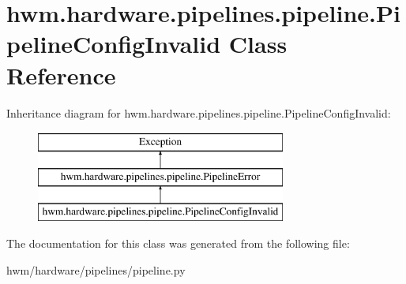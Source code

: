 \hypertarget{classhwm_1_1hardware_1_1pipelines_1_1pipeline_1_1_pipeline_config_invalid}{\section{hwm.\-hardware.\-pipelines.\-pipeline.\-Pipeline\-Config\-Invalid Class Reference}
\label{classhwm_1_1hardware_1_1pipelines_1_1pipeline_1_1_pipeline_config_invalid}
}
Inheritance diagram for hwm.\-hardware.\-pipelines.\-pipeline.\-Pipeline\-Config\-Invalid\-:\begin{figure}[H]
\begin{center}
\leavevmode
\includegraphics[height=3.000000cm]{classhwm_1_1hardware_1_1pipelines_1_1pipeline_1_1_pipeline_config_invalid}
\end{center}
\end{figure}


The documentation for this class was generated from the following file\-:\begin{DoxyCompactItemize}
\item 
hwm/hardware/pipelines/pipeline.\-py\end{DoxyCompactItemize}
